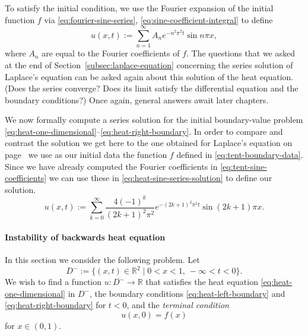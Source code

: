 To satisfy the initial condition, we use the Fourier expansion of the initial function $f$ via \eqref{eq:fourier-sine-series}, \eqref{eq:sine-coefficient-integral} to define
\begin{equation}\label{eq:heat-sine-series-solution}
u(x,t):=\sum_{n=1}^{\infty}A_ne^{-n^2\pi^2t}\sin n\pi x,
\end{equation}
where $A_n$ are equal to the Fourier coefficients of $f$. The questions that we asked at the end of Section~\ref{subsec:laplace-equation} concerning the series solution of Laplace's equation can be asked again about this solution of the heat equation. (Does the series converge? Does its limit satisfy the differential equation and the boundary conditions?) Once again, general answers await later chapters.

\begin{Example}
\label{ex:heat-tent-data}
We now formally compute a series solution for the initial boundary-value problem \eqref{eq:heat-one-dimensional}--\eqref{eq:heat-right-boundary}. In order to compare and contrast the solution we get here to the one obtained for Laplace's equation on page~\pageref{ex:tent-dirichlet-data} we use as our initial data the function $f$ defined in \eqref{eq:tent-boundary-data}. Since we have already computed the Fourier coefficients in \eqref{eq:tent-sine-coefficients} we can use these in \eqref{eq:heat-sine-series-solution} to define our solution.
\begin{equation}\label{eq:heat-tent-data-solution}
u(x,t):=\sum_{k=0}^{\infty}\dfrac{4(-1)^k}{(2k+1)^2\pi^2}e^{-(2k+1)^2\pi^2t}\sin(2k+1)\pi x.
\end{equation}

\end{Example}

\paragraph*{Instability of backwards heat equation}

In this section we consider the following problem. Let
\[
D^-:=\{(x,t)\in\mathbb{R}^2\mid 0<x<1,\ -\infty<t<0\}.
\]
We wish to find a function $u:\overline{D^-}\to\mathbb{R}$ that satisfies the heat equation \eqref{eq:heat-one-dimensional} in $D^-$, the boundary conditions \eqref{eq:heat-left-boundary} and \eqref{eq:heat-right-boundary} for $t<0$, and the \emph{terminal condition}
\begin{equation}\label{eq:heat-terminal-condition}
u(x,0)=f(x)
\end{equation}
for $x\in(0,1)$.

